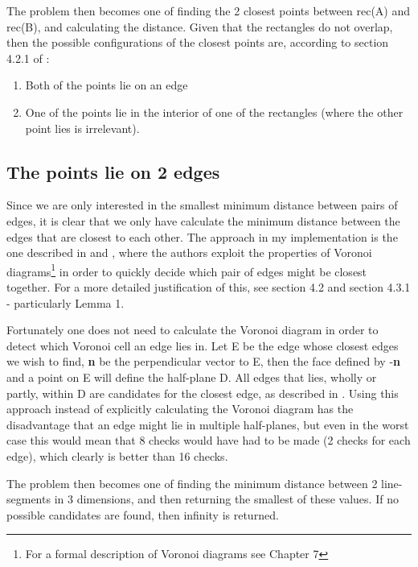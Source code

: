 The problem then becomes one of finding the 2 closest points between rec(A) and rec(B), and calculating the distance.
Given that the rectangles do not overlap, then the possible configurations of the closest points are, according to section 4.2.1 of \cite{Larsen99fastproximity}:
\begin{enumerate}
\item Both of the points lie on an edge
\item One of the points lie in the interior of one of the rectangles (where the other point lies is irrelevant).
\end{enumerate}

\subsection{The points lie on 2 edges}
\label{minimumDistance}
Since we are only interested in the smallest minimum distance between pairs of edges, it is clear that we only have calculate the minimum distance between the edges that are closest to each other. The approach in my implementation is the one described in \cite{larsen00fast} and \cite{Larsen99fastproximity}, where the authors exploit the properties of Voronoi diagrams\footnote{For a formal description of Voronoi diagrams see \cite{compgeom:2008} Chapter 7} in order to quickly decide which pair of edges might be closest together. For a more detailed justification of this, see \cite{larsen00fast} section 4.2 and \cite{Larsen99fastproximity} section 4.3.1 - particularly Lemma 1.

Fortunately one does not need to calculate the Voronoi diagram in order to detect which Voronoi cell an edge lies in. Let E be the edge whose closest edges we wish to find, \textbf{n} be the perpendicular vector to E, then the face defined by -\textbf{n} and a point on E will define the half-plane D. All edges that lies, wholly or partly, within D are candidates for the closest edge, as described in \cite{larsen00fast}. Using this approach instead of explicitly calculating the Voronoi diagram has the disadvantage that an edge might lie in multiple half-planes, but even in the worst case this would mean that 8 checks would have had to be made (2 checks for each edge), which clearly is better than 16 checks.

The problem then becomes one of finding the minimum distance between 2 line-segments in 3 dimensions, and then returning the smallest of these values. If no possible candidates are found, then infinity is returned.

